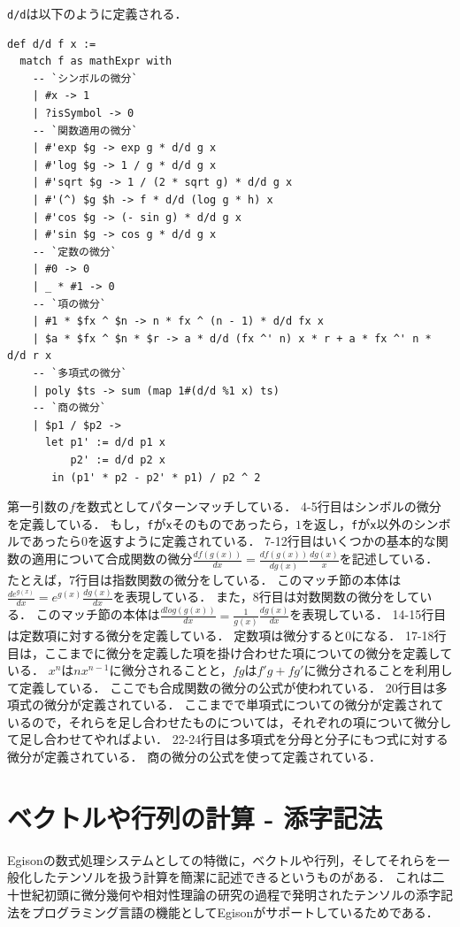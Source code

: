 \lstinline{d/d}は以下のように定義される．
\begin{lstlisting}[language=egison]
def d/d f x :=
  match f as mathExpr with
    -- `シンボルの微分`
    | #x -> 1
    | ?isSymbol -> 0
    -- `関数適用の微分`
    | #'exp $g -> exp g * d/d g x
    | #'log $g -> 1 / g * d/d g x
    | #'sqrt $g -> 1 / (2 * sqrt g) * d/d g x
    | #'(^) $g $h -> f * d/d (log g * h) x
    | #'cos $g -> (- sin g) * d/d g x
    | #'sin $g -> cos g * d/d g x
    -- `定数の微分`
    | #0 -> 0
    | _ * #1 -> 0
    -- `項の微分`
    | #1 * $fx ^ $n -> n * fx ^ (n - 1) * d/d fx x
    | $a * $fx ^ $n * $r -> a * d/d (fx ^' n) x * r + a * fx ^' n * d/d r x
    -- `多項式の微分`
    | poly $ts -> sum (map 1#(d/d %1 x) ts)
    -- `商の微分`
    | $p1 / $p2 ->
      let p1' := d/d p1 x
          p2' := d/d p2 x
       in (p1' * p2 - p2' * p1) / p2 ^ 2
\end{lstlisting}
第一引数の$f$を数式としてパターンマッチしている．
4-5行目はシンボルの微分を定義している．
もし，\lstinline{f}が\lstinline{x}そのものであったら，$1$を返し，\lstinline{f}が\lstinline{x}以外のシンボルであったら$0$を返すように定義されている．
7-12行目はいくつかの基本的な関数の適用について合成関数の微分$\frac{df(g(x))}{dx} = \frac{df(g(x))}{dg(x)} \frac{dg(x)}{x}$を記述している．
たとえば，7行目は指数関数の微分をしている．
このマッチ節の本体は$\frac{de^{g(x)}}{dx} = e^{g(x)} \frac{dg(x)}{dx}$を表現している．
また，8行目は対数関数の微分をしている．
このマッチ節の本体は$\frac{dlog(g(x))}{dx} = \frac{1}{g(x)} \frac{dg(x)}{dx}$を表現している．
14-15行目は定数項に対する微分を定義している．
定数項は微分すると$0$になる．
17-18行目は，ここまでに微分を定義した項を掛け合わせた項についての微分を定義している．
$x^n$は$n x^{n-1}$に微分されることと，$f g$は$f' g + f g'$に微分されることを利用して定義している．
ここでも合成関数の微分の公式が使われている．
20行目は多項式の微分が定義されている．
ここまでで単項式についての微分が定義されているので，それらを足し合わせたものについては，それぞれの項について微分して足し合わせてやればよい．
22-24行目は多項式を分母と分子にもつ式に対する微分が定義されている．
商の微分の公式を使って定義されている．

\section{ベクトルや行列の計算 - 添字記法}\label{cas-linear}

Egisonの数式処理システムとしての特徴に，ベクトルや行列，そしてそれらを一般化したテンソルを扱う計算を簡潔に記述できるというものがある．
これは二十世紀初頭に微分幾何や相対性理論の研究の過程で発明されたテンソルの添字記法をプログラミング言語の機能としてEgisonがサポートしているためである．

